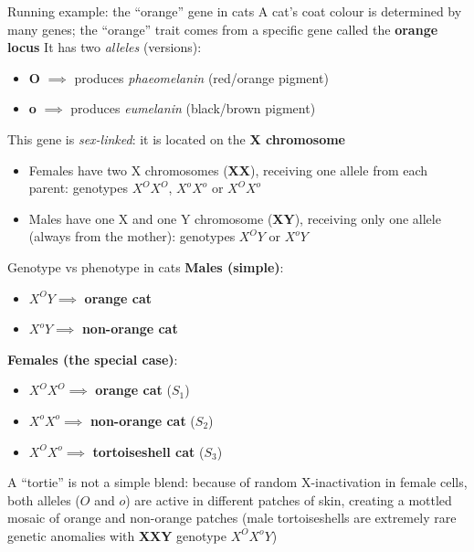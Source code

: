 \documentclass[aspectratio=169]{beamer}\usepackage[]{graphicx}\usepackage[]{xcolor}
\begin{document}
\begin{frame}{Running example: the ``orange'' gene in cats}
A cat's coat colour is determined by many genes; the ``orange'' trait comes from a specific gene called the \textbf{orange locus}
\vfill
It has two \emph{alleles} (versions):
\begin{itemize}
\item \textbf{O} $\implies$ produces \emph{phaeomelanin} (red/orange pigment)
\item \textbf{o} $\implies$ produces \emph{eumelanin} (black/brown pigment)
\end{itemize}
\vfill
This gene is \emph{sex-linked}: it is located on the \textbf{X chromosome}
\begin{itemize}
\item Females have two X chromosomes (\textbf{XX}), receiving one allele from each parent: genotypes $X^O X^O$, $X^o X^o$ or $X^O X^o$
\item Males have one X and one Y chromosome (\textbf{XY}), receiving only one allele (always from the mother): genotypes $X^O Y$ or $X^o Y$
\end{itemize}
\end{frame}

\begin{frame}{Genotype vs phenotype in cats}
\textbf{Males (simple)}:
\begin{itemize}
\item $X^O Y \implies$ \textbf{orange cat}
\item $X^o Y \implies$ \textbf{non-orange cat}
\end{itemize}
\vfill
\textbf{Females (the special case)}:
\begin{itemize}
\item $X^O X^O \implies$ \textbf{orange cat} ($S_1$)
\item $X^o X^o \implies$ \textbf{non-orange cat} ($S_2$)
\item $X^O X^o \implies$ \textbf{tortoiseshell cat} ($S_3$)
\end{itemize}
\vfill
A ``tortie'' is not a simple blend: because of random X-inactivation in female cells, both alleles ($O$ and $o$) are active in different patches of skin, creating a mottled mosaic of orange and non-orange patches (male tortoiseshells are extremely rare genetic anomalies with \textbf{XXY} genotype $X^O X^o Y$)
\end{frame}
\end{document}
